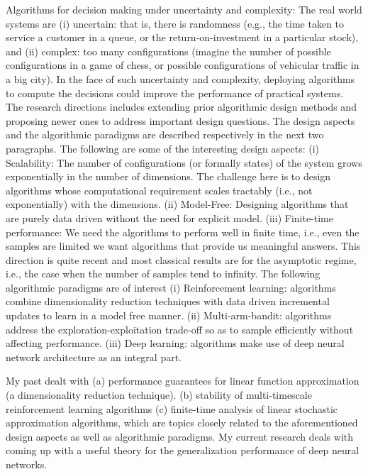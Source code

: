 Algorithms for  decision making under uncertainty and complexity:
The real world systems are (i) uncertain: that is, there is randomness (e.g., the time taken to service a customer in a queue, or the return-on-investment in a particular stock), and (ii) complex: too many configurations (imagine the number of possible configurations in a game of chess, or possible configurations of vehicular traffic in a big city). In the face of such uncertainty and complexity, deploying algorithms to compute the decisions could improve the performance of practical systems. The research directions includes  extending prior algorithmic design methods and  proposing newer ones to address important design questions. The design aspects and the algorithmic paradigms are described respectively in the next two paragraphs.
	The following are some of the interesting design aspects:
(i) Scalability: The number of configurations (or formally states) of the system grows exponentially in the number of dimensions. The challenge here is to design algorithms whose computational requirement scales tractably (i.e., not exponentially) with the dimensions. 
(ii) Model-Free: Designing algorithms that are purely data driven without the need for explicit model.
(iii) Finite-time performance: We need the algorithms to perform well in finite time, i.e., even the samples are limited we want algorithms that provide us meaningful answers. This direction is quite recent and most classical results are for the asymptotic regime, i.e., the case when the number of samples tend to infinity.
	The following algorithmic paradigms are of interest
(i) Reinforcement learning: algorithms combine dimensionality reduction techniques with data driven incremental updates to learn in a model free manner. 
(ii) Multi-arm-bandit: algorithms address the exploration-exploitation trade-off so as to sample efficiently without affecting performance.
(iii) Deep learning: algorithms make use of deep neural network architecture as an integral part. 

My past dealt with (a) performance guarantees for linear function approximation (a dimensionality reduction technique). (b) stability of multi-timescale reinforcement learning algorithms (c)  finite-time analysis of linear stochastic approximation algorithms, which are topics closely related to the aforementioned design aspects as well as algorithmic paradigms. My current research deals with coming up with a useful theory for the generalization performance of deep neural networks.
